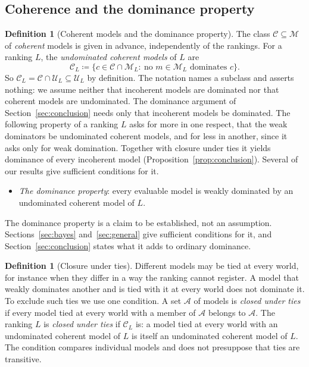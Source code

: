 \documentclass[11pt]{article}
\theoremstyle{definition}
\newtheorem{definition}[theorem]{Definition}
\theoremstyle{remark}
\newcommand{\M}{\mathcal M}
\newcommand{\C}{\mathcal C}
\newcommand{\U}{\mathcal U}
\begin{document}
\subsection{Coherence and the dominance property}
\begin{definition}[Coherent models and the dominance property]\label{def:coherence-property}
The class $\C\subseteq\M$ of \emph{coherent} models is given in advance, independently of the rankings. For a ranking $L$, the \emph{undominated coherent models} of $L$ are
\[
\C_L\coloneqq\{c\in\C\cap\M_L:\ \text{no } m\in\M_L \text{ dominates } c\}.
\]
So $\C_L=\C\cap\U_L\subseteq\U_L$ by definition. The notation names a subclass and asserts nothing: we assume neither that incoherent models are dominated nor that coherent models are undominated. The dominance argument of Section~\ref{sec:conclusion} needs only that incoherent models be dominated. The following property of a ranking $L$ asks for more in one respect, that the weak dominators be undominated coherent models, and for less in another, since it asks only for weak domination. Together with closure under ties it yields dominance of every incoherent model (Proposition~\ref{prop:conclusion}). Several of our results give sufficient conditions for it.
\begin{itemize}[leftmargin=*]
\item \emph{The dominance property}: every evaluable model is weakly dominated by an undominated coherent model of $L$.
\end{itemize}
\end{definition}

The dominance property is a claim to be established, not an assumption. Sections~\ref{sec:bayes} and~\ref{sec:general} give sufficient conditions for it, and Section~\ref{sec:conclusion} states what it adds to ordinary dominance.

\begin{definition}[Closure under ties]\label{def:tie-closure}
Different models may be tied at every world, for instance when they differ in a way the ranking cannot register. A model that weakly dominates another and is tied with it at every world does not dominate it. To exclude such ties we use one condition. A set $\mathcal A$ of models is \emph{closed under ties} if every model tied at every world with a member of $\mathcal A$ belongs to $\mathcal A$. The ranking $L$ is \emph{closed under ties} if $\C_L$ is: a model tied at every world with an undominated coherent model of $L$ is itself an undominated coherent model of $L$. The condition compares individual models and does not presuppose that ties are transitive.
\end{definition}
\end{document}
